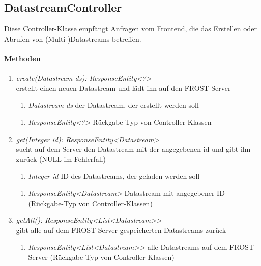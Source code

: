 \subsection*{DatastreamController}\label{dataCon}
Diese Controller-Klasse empfängt Anfragen vom Frontend, die das Erstellen oder Abrufen von (Multi-)Datastreams betreffen.


\paragraph{Methoden}

\begin{enumerate}[+]
	\item \textit{ create(Datastream ds): ResponseEntity<?> }\\
	erstellt einen neuen Datastream und lädt ihn auf den FROST-Server
	
	\begin{enumerate}[$\bullet$]
		\item \textit{Datastream ds} der Datastream, der erstellt werden soll
		
	\end{enumerate}
	\vspace{-0.2cm}
	\begin{enumerate}[$\circ$]
		\item \textit{ResponseEntity<?>} Rückgabe-Typ von Controller-Klassen
	\end{enumerate}
	
	\item \textit{ get(Integer id): ResponseEntity<Datastream> }\\
	sucht auf dem Server den Datastream mit der angegebenen id und gibt ihn zurück (NULL im Fehlerfall)
	
	\begin{enumerate}[$\bullet$]
		\item \textit{Integer id} ID des Datastreams, der geladen werden soll
		
	\end{enumerate}
	\vspace{-0.2cm}
	\begin{enumerate}[$\circ$]
		\item \textit{ResponseEntity<Datastream>} Datastream mit angegebener ID (Rückgabe-Typ von Controller-Klassen)
	\end{enumerate}
	\item \textit{ getAll(): ResponseEntity<List<Datastream>> }\\
	gibt alle auf dem FROST-Server gespeicherten Datastreams zurück
	
	\begin{enumerate}[$\circ$]
		\item \textit{ResponseEntity<List<Datastream>>} alle Datastreams auf dem FROST-Server (Rückgabe-Typ von Controller-Klassen)
	\end{enumerate}
	
	
\end{enumerate}	